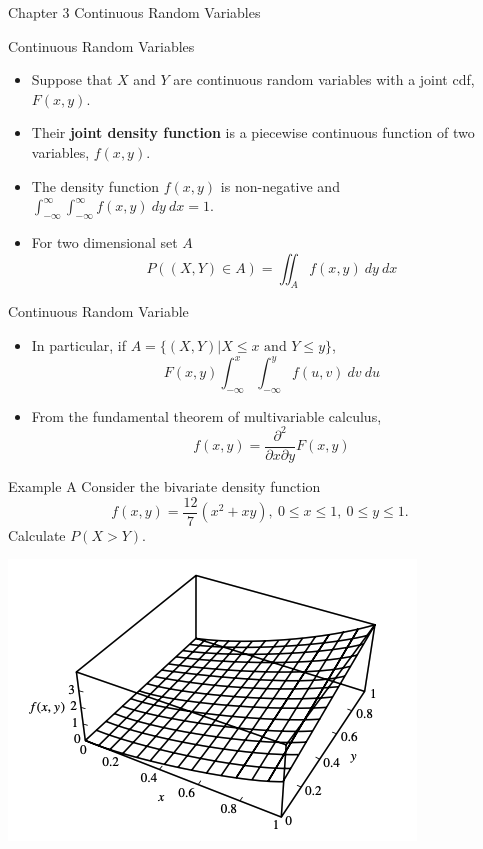 \documentclass{beamer}
\begin{document}
\begin{frame}{Chapter 3}
    \Huge{Continuous Random Variables}
\end{frame}

\begin{frame}{Continuous Random Variables}
    \begin{itemize}
        \item Suppose that \(X\) and \(Y\) are continuous random variables with a joint cdf, \(F(x,y)\). \pause
        \item Their \textbf{joint density function} is a piecewise continuous function of two variables, \(f(x,y)\). \pause
        \item The density function \(f(x,y)\) is non-negative and \(\int_{-\infty}^{\infty} \int_{-\infty}^{\infty} f(x,y)~dy~dx=1\). \pause
        \item For two dimensional set \(A\) \[P((X,Y) \in A)= \iint_A f(x,y)~dy~dx\]
    \end{itemize}
\end{frame}

\begin{frame}{Continuous Random Variable}
    \begin{itemize}
        \item In particular, if \(A=\{(X,Y)|X \leq x \text{ and }Y \leq y\}\), \[F(x,y) \int_{-\infty}^x \int_{-\infty}^{y} f(u,v)~dv~du\]\pause
        \item From the fundamental theorem of multivariable calculus, \[f(x,y)= \dfrac{\partial^2}{\partial x \partial y}F(x,y)\]
    \end{itemize}
\end{frame}

\begin{frame}{Example A}
    Consider the bivariate density function \[f(x,y)=\dfrac{12}{7}(x^2+xy),~0 \leq x \leq 1,~0\leq y \leq 1.\] Calculate \(P(X>Y)\). 

    \includegraphics[scale=0.5]{Figures/fig_7.png}


\end{frame}
\end{document}
